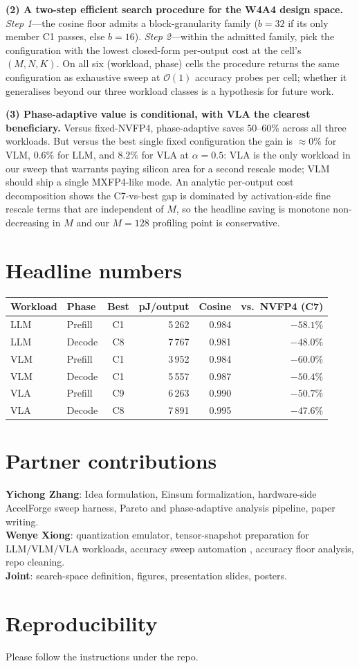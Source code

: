 \documentclass[10pt]{article}
\begin{document}
\textbf{(2) A two-step efficient search procedure for the W4A4 design
space.}
\emph{Step 1}---the cosine floor admits a block-granularity
family ($b{=}32$ if its only member C1 passes, else $b{=}16$).
\emph{Step 2}---within the admitted family, pick the
configuration with the lowest closed-form per-output cost at the
cell's $(M,N,K)$.  On all six (workload, phase) cells the
procedure returns the same configuration as exhaustive sweep at
$\mathcal{O}(1)$ accuracy probes per cell; whether it generalises
beyond our three workload classes is a hypothesis for future
work.

\textbf{(3) Phase-adaptive value is conditional, with VLA the
clearest beneficiary.}  Versus fixed-NVFP4, phase-adaptive saves
$50$--$60\%$ across all three workloads.  But versus the best
single fixed configuration the gain is $\approx 0\%$ for VLM,
$0.6\%$ for LLM, and $8.2\%$ for VLA at $\alpha{=}0.5$: VLA is the
only workload in our sweep that warrants paying silicon area for
a second rescale mode; VLM should ship a single MXFP4-like mode.
An analytic per-output cost decomposition shows the C7-vs-best gap
is dominated by activation-side fine rescale terms that are
independent of $M$, so the headline saving is monotone
non-decreasing in $M$ and our $M{=}128$ profiling point is
conservative.

\section*{Headline numbers}
\begin{center}
\small
\begin{tabular}{@{}llcrrr@{}}
\toprule
Workload & Phase & Best & pJ/output & Cosine & vs.\ NVFP4 (C7) \\
\midrule
LLM & Prefill & C1 & 5\,262 & 0.984 & $-58.1\%$ \\
LLM & Decode  & C8 & 7\,767 & 0.981 & $-48.0\%$ \\
VLM & Prefill & C1 & 3\,952 & 0.984 & $-60.0\%$ \\
VLM & Decode  & C1 & 5\,557 & 0.987 & $-50.4\%$ \\
VLA & Prefill & C9 & 6\,263 & 0.990 & $-50.7\%$ \\
VLA & Decode  & C8 & 7\,891 & 0.995 & $-47.6\%$ \\
\bottomrule
\end{tabular}
\end{center}

\section*{Partner contributions}
\textbf{Yichong Zhang}: Idea formulation, Einsum formalization,
hardware-side AccelForge sweep harness, Pareto and phase-adaptive analysis pipeline, paper writing.\\
\textbf{Wenye Xiong}: quantization emulator, tensor-snapshot preparation for LLM/VLM/VLA workloads, accuracy sweep automation
, accuracy floor analysis, repo cleaning.\\
\textbf{Joint}: search-space definition, figures, presentation slides, posters.

\section*{Reproducibility}
Please follow the instructions under the repo.
\end{document}
